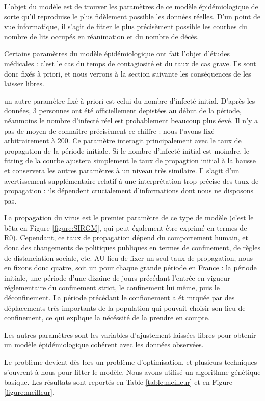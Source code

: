 \documentclass[review]{elsarticle}
\begin{document}
L'objet du modèle est de trouver les paramètres de ce modèle épidémiologique de sorte qu'il reproduise le plus fidèlement possible les données réelles. D'un point de vue informatique, il s'agit de fitter le plus précisèment possible les courbes du nombre de lits occupés en réanimation et du nombre de décès. 

Certains paramètres du modèle épidémiologique ont fait l'objet d'études médicales : c'est le cas du temps de contagiosité et du taux de cas grave. Ils sont donc fixés à priori, et nous verrons à la section suivante les conséquences de les laisser libres.

un autre paramètre fixé à priori est celui du nombre d'infecté initial. D'après les données, 3 personnes ont été officiellement depistées au début de la période, néanmoins le nombre d'infecté réel est probablement beaucoup plus éevé. Il n'y a pas de moyen de connaître précisèment ce chiffre : nous l'avons fixé arbitrairement à 200. Ce paramètre interagit principalement avec le taux de propagation de la période initiale. Si le nombre d'infecté initial est moindre, le fitting de la courbe ajustera simplement le taux de propagtion initial à la hausse et conservera les autres paramètres à un niveau très similaire. Il s'agit d'un avertissement supplémentaire relatif à une interprétation trop précise des taux de propagation : ils dépendent crucialement d'informations dont nous ne disposons pas.

La propagation du virus est le premier paramètre de ce type de modèle (c'est le bêta en Figure \ref{figure:SIRGM}, qui peut également être exprimé en termes de R0). Cependant, ce taux de propagation dépend du comportement humain, et donc des changements de politiques publiques en termes de confinement, de règles de distanciation sociale, etc. AU lieu de fixer un seul taux de propagation, nous en fixons donc quatre, soit un pour chaque grande période en France : la période initiale, une période d'une dizaine de jours précédant l'entrée en vigueur réglementaire du confinement strict, le confinement lui même, puis le déconfinement. La période précédant le confionement a ét mrquée par des déplacements très importants de la population qui pouvait choisir son lieu de confinement, ce qui explique la nécéssité de la prendre en compte.

Les autres paramètres sont les variables d'ajustement laissées libres pour obtenir un modèle épidémiologique cohérent avec les données observées.

Le problème devient dès lors un problème d'optimisation, et plusieurs techniques s'ouvrent à nous pour fitter le modèle. Nous avons utilisé un algorithme génétique basique. Les résultats sont reportés en Table \ref{table:meilleur} et en Figure \ref{figure:meilleur}.
\end{document}
